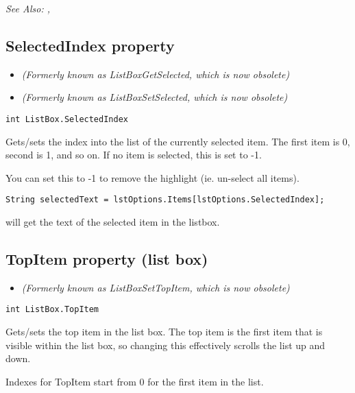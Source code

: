 \it{See Also:} ,


\subsection{SelectedIndex property}\label{ListBox.SelectedIndex}%

\begin{itemize}
\item \it{(Formerly known as ListBoxGetSelected, which is now obsolete)}
\item \it{(Formerly known as ListBoxSetSelected, which is now obsolete)}
\end{itemize}

\begin{verbatim}
int ListBox.SelectedIndex
\end{verbatim}
Gets/sets the index into the list of the currently selected item. The first
item is 0, second is 1, and so on. If no item is selected, this is set to -1.

You can set this to -1 to remove the highlight (ie. un-select all items).

\begin{verbatim}
String selectedText = lstOptions.Items[lstOptions.SelectedIndex];
\end{verbatim}
will get the text of the selected item in the listbox.


\subsection{TopItem property (list box)}\label{ListBox.TopItem}%

\begin{itemize}
\item \it{(Formerly known as ListBoxSetTopItem, which is now obsolete)}
\end{itemize}

\begin{verbatim}
int ListBox.TopItem
\end{verbatim}
Gets/sets the top item in the list box. The top item is the first item that is visible
within the list box, so changing this effectively scrolls the list up and down.

Indexes for TopItem start from 0 for the first item in the list.

